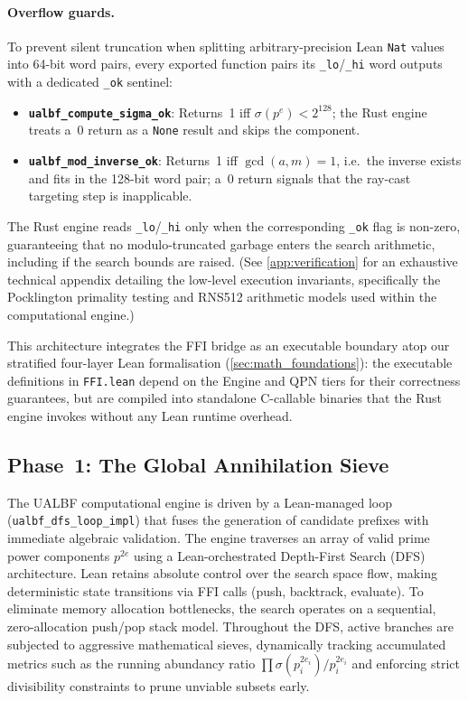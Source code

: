 \paragraph{Overflow guards.}
To prevent silent truncation when splitting arbitrary-precision Lean
\texttt{Nat} values into 64-bit word pairs, every exported function
pairs its \texttt{\_lo}/\texttt{\_hi} word outputs with a dedicated
\texttt{\_ok} sentinel:
\begin{itemize}
  \item \textbf{\texttt{ualbf\_compute\_sigma\_ok}}: Returns~1 iff
    $\sigma(p^e) < 2^{128}$; the Rust engine treats a~0 return as a
    \texttt{None} result and skips the component.
  \item \textbf{\texttt{ualbf\_mod\_inverse\_ok}}: Returns~1 iff
    $\gcd(a, m) = 1$, i.e.\ the inverse exists and fits in the
    128-bit word pair; a~0 return signals that the ray-cast targeting
    step is inapplicable.
\end{itemize}
The Rust engine reads \texttt{\_lo}/\texttt{\_hi} only when the
corresponding \texttt{\_ok} flag is non-zero, guaranteeing that
no modulo-truncated garbage enters the search arithmetic, including
if the search bounds are raised. (See \cref{app:verification} for an exhaustive technical appendix detailing the low-level execution invariants, specifically the Pocklington primality testing and RNS512 arithmetic models used within the computational engine.)

This architecture integrates the FFI bridge as an executable boundary atop our
stratified four-layer Lean formalisation (\cref{sec:math_foundations}): the executable
definitions in \texttt{FFI.lean} depend on the Engine and QPN tiers for their
correctness guarantees, but are compiled into standalone C-callable
binaries that the Rust engine invokes without any Lean runtime overhead.


\subsection{Phase~1: The Global Annihilation Sieve}
\label{subsec:global_sieve}

The UALBF computational engine is driven by a Lean-managed loop
(\texttt{ualbf\_\allowbreak{}dfs\_\allowbreak{}loop\_\allowbreak{}impl}) that fuses the generation of candidate prefixes with
immediate algebraic validation.  The engine traverses an array of valid
prime power components $p^{2e}$ using a Lean-orchestrated Depth-First Search (DFS)
architecture. Lean retains absolute control over the search space flow, making deterministic
state transitions via FFI calls (push, backtrack, evaluate). To eliminate memory allocation bottlenecks,
the search operates on a sequential, zero-allocation push/pop stack model.
Throughout the DFS, active branches are subjected to
aggressive mathematical sieves, dynamically tracking accumulated metrics
such as the running abundancy ratio
$\prod \sigma(p_i^{2e_i})/p_i^{2e_i}$ and enforcing strict divisibility
constraints to prune unviable subsets early.

